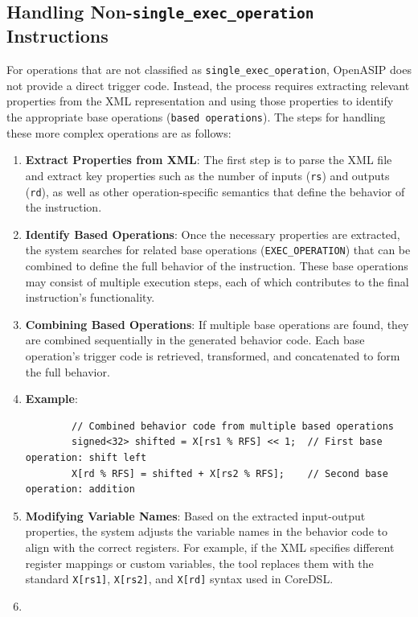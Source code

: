 \subsection{Handling Non-\texttt{single\_exec\_operation} Instructions}

For operations that are not classified as \texttt{single\_exec\_operation}, OpenASIP does not provide a direct trigger code. Instead, the process requires extracting relevant properties from the XML representation and using those properties to identify the appropriate base operations (\texttt{based operations}). The steps for handling these more complex operations are as follows:

\begin{enumerate}
    \item \textbf{Extract Properties from XML}: The first step is to parse the XML file and extract key properties such as the number of inputs (\texttt{rs}) and outputs (\texttt{rd}), as well as other operation-specific semantics that define the behavior of the instruction.

    \item \textbf{Identify Based Operations}: Once the necessary properties are extracted, the system searches for related base operations (\texttt{EXEC\_OPERATION}) that can be combined to define the full behavior of the instruction. These base operations may consist of multiple execution steps, each of which contributes to the final instruction's functionality.

    \item \textbf{Combining Based Operations}: If multiple base operations are found, they are combined sequentially in the generated behavior code. Each base operation's trigger code is retrieved, transformed, and concatenated to form the full behavior.

    \item \textbf{Example}:
    \begin{lstlisting}
        // Combined behavior code from multiple based operations
        signed<32> shifted = X[rs1 % RFS] << 1;  // First base operation: shift left
        X[rd % RFS] = shifted + X[rs2 % RFS];    // Second base operation: addition
    \end{lstlisting}

    \item \textbf{Modifying Variable Names}: Based on the extracted input-output properties, the system adjusts the variable names in the behavior code to align with the correct registers. For example, if the XML specifies different register mappings or custom variables, the tool replaces them with the standard \texttt{X[rs1]}, \texttt{X[rs2]}, and \texttt{X[rd]} syntax used in CoreDSL.
    \item
\end{enumerate}


